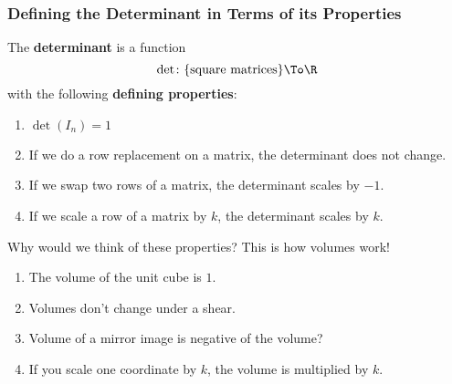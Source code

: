
\begin{frame}
\frametitle{Defining the Determinant in Terms of its Properties}

\vskip-3mm
\begin{defn}
  The \textbf{determinant} is a function
  \[ \det\colon \{\text{square matrices}\} \To \R \]
  with the following \textbf{defining properties}:
  \pause
  \begin{enumerate}
  \item $\det(I_n) = 1$
    \pause
  \item If we do a row replacement on a matrix, the determinant does not change.
    \pause
  \item If we swap two rows of a matrix, the determinant scales by $-1$.
    \pause
  \item If we scale a row of a matrix by $k$, the determinant scales by $k$.
  \end{enumerate}
\end{defn}

\pause\medskip
Why would we think of these properties?
\pause
This is how volumes work!
\pause
\begin{enumerate}
\item The volume of the unit cube is $1$.
\pause
\item Volumes don't change under a shear.
\pause
\item Volume of a mirror image is negative of the volume?
\pause
\item If you scale one coordinate by $k$, the volume is multiplied by $k$.

\end{enumerate}

\end{frame}



